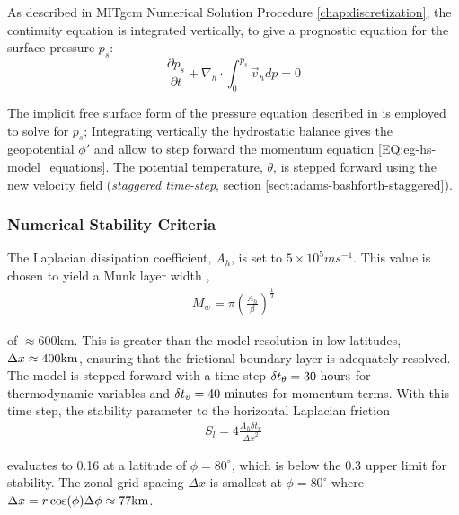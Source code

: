 As described in MITgcm Numerical Solution Procedure \ref{chap:discretization}, 
the continuity equation is integrated vertically, to give a prognostic
equation for the surface pressure $p_s$:
\begin{equation}
\frac{\partial p_s}{\partial t} + \nabla_{h}\cdot \int_{0}^{p_s} \vec{v}_h dp
= 0
\end{equation}

The implicit free surface form of the pressure equation described in 
\cite{marshall:97a} is employed to solve for $p_s$; 
Integrating vertically the hydrostatic balance 
gives the geopotential $\phi'$ and allow to step forward the momentum equation
\ref{EQ:eg-hs-model_equations}.
The potential temperature, $\theta$, is stepped forward using the 
new velocity field ({\it staggered time-step}, section 
\ref{sect:adams-bashforth-staggered}).
\\

\subsubsection{Numerical Stability Criteria}
\label{www:tutorials}

The Laplacian dissipation coefficient, $A_h$, is set to $5 \times 10^5 m s^{-1}$.
This value is chosen to yield a Munk layer width \cite{adcroft:95},
\begin{eqnarray}
\label{EQ:eg-hs-munk_layer}
M_{w} = \pi ( \frac { A_h }{ \beta } )^{\frac{1}{3}}
\end{eqnarray}

\noindent  of $\approx 600$km. This is greater than the model
resolution in low-latitudes, $\Delta x \approx 400{\rm km}$, ensuring that the frictional 
boundary layer is adequately resolved.
\\

\noindent The model is stepped forward with a 
time step $\delta t_{\theta}=30~{\rm hours}$ for thermodynamic variables and
$\delta t_{v}=40~{\rm minutes}$ for momentum terms. With this time step, the stability 
parameter to the horizontal Laplacian friction \cite{adcroft:95}
\begin{eqnarray}
\label{EQ:eg-hs-laplacian_stability}
S_{l} = 4 \frac{A_h \delta t_{v}}{{\Delta x}^2}
\end{eqnarray}

\noindent evaluates to 0.16 at a latitude of $\phi=80^{\circ}$, which is below the 
0.3 upper limit for stability. The zonal grid spacing $\Delta x$ is smallest at
$\phi=80^{\circ}$ where $\Delta x=r\cos(\phi)\Delta \phi\approx 77{\rm km}$.
\\

